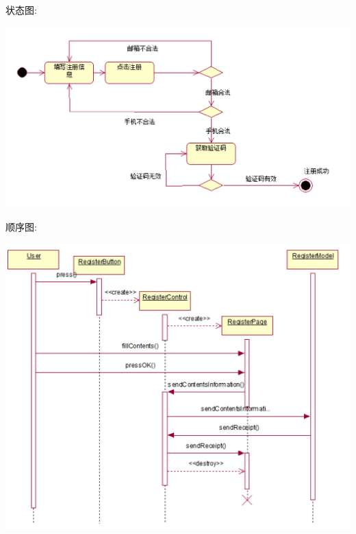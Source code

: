 \documentclass[11pt]{article}
\begin{document}
			状态图: 
			\begin{center}
			\includegraphics[scale=0.42]{注册_状态图.png}
			\end{center}

			顺序图: 
			\begin{center}
			\includegraphics[scale=0.42]{注册_顺序图.png}
			\end{center}
\end{document}

